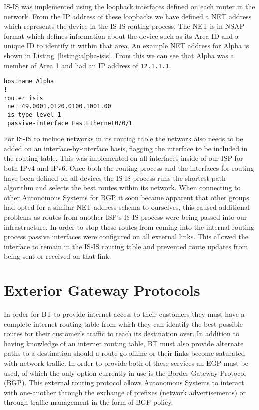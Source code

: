 IS-IS was implemented using the loopback interfaces defined on each router in
the network. From the IP address of these loopbacks we have defined a NET
address which represents the device in the IS-IS routing process. The NET is in
NSAP format which defines information about the device such as its Area ID and
a unique ID to identify it within that area. An example NET address for Alpha
is shown in Listing~\ref{listing:alpha-isis}. From this we can see that Alpha
was a member of Area 1 and had an IP address of \texttt{12.1.1.1}.

\begin{lstlisting}[caption={Alpha IS-IS Configuration}, label={listing:alpha-isis}]
hostname Alpha
!
router isis
 net 49.0001.0120.0100.1001.00
 is-type level-1
 passive-interface FastEthernet0/0/1
\end{lstlisting}

For IS-IS to include networks in its routing table the network also needs to be
added on an interface-by-interface basis, flagging the interface to be included
in the routing table. This was implemented on all interfaces inside of our ISP
for both IPv4 and IPv6. Once both the routing process and the interfaces for
routing have been defined on all devices the IS-IS process runs the shortest
path algorithm and selects the best routes within its network. When connecting
to other Autonomous Systems for BGP it soon became apparent that other groups
had opted for a similar NET address schema to ourselves, this caused additional
problems as routes from another ISP's IS-IS process were being passed into our
infrastructure. In order to stop these routes from coming into the internal
routing process passive interfaces were configured on all external links. This
allowed the interface to remain in the IS-IS routing table and prevented route
updates from being sent or received on that link.

\section{Exterior Gateway Protocols}
In order for BT to provide internet access to their customers they must have a
complete internet routing table from which they can identify the best possible
routes for their customer's traffic to reach its destination over. In addition
to having knowledge of an internet routing table, BT must also provide
alternate paths to a destination should a route go offline or their links
become saturated with network traffic. In order to provide both of these
services an EGP must be used, of which the only option currently in use is the Border
Gateway Protocol (BGP). This external routing protocol allows Autonomous
Systems to interact with one-another through the exchange of prefixes (network
advertisements) or through traffic management in the form of BGP policy.


